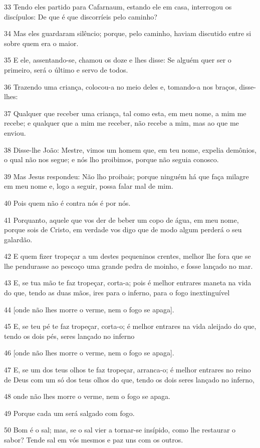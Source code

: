 \par 33 Tendo eles partido para Cafarnaum, estando ele em casa, interrogou os discípulos: De que é que discorríeis pelo caminho?
\par 34 Mas eles guardaram silêncio; porque, pelo caminho, haviam discutido entre si sobre quem era o maior.
\par 35 E ele, assentando-se, chamou os doze e lhes disse: Se alguém quer ser o primeiro, será o último e servo de todos.
\par 36 Trazendo uma criança, colocou-a no meio deles e, tomando-a nos braços, disse-lhes:
\par 37 Qualquer que receber uma criança, tal como esta, em meu nome, a mim me recebe; e qualquer que a mim me receber, não recebe a mim, mas ao que me enviou.
\par 38 Disse-lhe João: Mestre, vimos um homem que, em teu nome, expelia demônios, o qual não nos segue; e nós lho proibimos, porque não seguia conosco.
\par 39 Mas Jesus respondeu: Não lho proibais; porque ninguém há que faça milagre em meu nome e, logo a seguir, possa falar mal de mim.
\par 40 Pois quem não é contra nós é por nós.
\par 41 Porquanto, aquele que vos der de beber um copo de água, em meu nome, porque sois de Cristo, em verdade vos digo que de modo algum perderá o seu galardão.
\par 42 E quem fizer tropeçar a um destes pequeninos crentes, melhor lhe fora que se lhe pendurasse ao pescoço uma grande pedra de moinho, e fosse lançado no mar.
\par 43 E, se tua mão te faz tropeçar, corta-a; pois é melhor entrares maneta na vida do que, tendo as duas mãos, ires para o inferno, para o fogo inextinguível
\par 44 [onde não lhes morre o verme, nem o fogo se apaga].
\par 45 E, se teu pé te faz tropeçar, corta-o; é melhor entrares na vida aleijado do que, tendo os dois pés, seres lançado no inferno
\par 46 [onde não lhes morre o verme, nem o fogo se apaga].
\par 47 E, se um dos teus olhos te faz tropeçar, arranca-o; é melhor entrares no reino de Deus com um só dos teus olhos do que, tendo os dois seres lançado no inferno,
\par 48 onde não lhes morre o verme, nem o fogo se apaga.
\par 49 Porque cada um será salgado com fogo.
\par 50 Bom é o sal; mas, se o sal vier a tornar-se insípido, como lhe restaurar o sabor? Tende sal em vós mesmos e paz uns com os outros.


